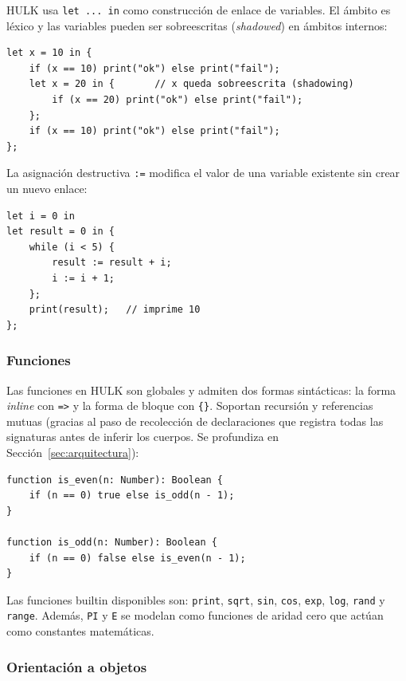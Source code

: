 \documentclass[12pt, a4paper]{article}
\begin{document}
HULK usa \texttt{let ... in} como construcción de enlace de variables. El
ámbito es léxico y las variables pueden ser sobreescritas (\textit{shadowed}) en ámbitos internos:

\begin{lstlisting}[caption={Variables y shadowing en HULK}, label=lst:let]
let x = 10 in {
    if (x == 10) print("ok") else print("fail");
    let x = 20 in {       // x queda sobreescrita (shadowing)
        if (x == 20) print("ok") else print("fail");
    };
    if (x == 10) print("ok") else print("fail");
};
\end{lstlisting}

La asignación destructiva \texttt{:=} modifica el valor de una variable
existente sin crear un nuevo enlace:

\begin{lstlisting}[caption={Asignación destructiva}, label=lst:assign]
let i = 0 in
let result = 0 in {
    while (i < 5) {
        result := result + i;
        i := i + 1;
    };
    print(result);   // imprime 10
};
\end{lstlisting}

\subsubsection{Funciones}

Las funciones en HULK son globales y admiten dos formas sintácticas: la forma
\textit{inline} con \texttt{=>} y la forma de bloque con \texttt{\{\}}. Soportan
recursión y referencias mutuas (gracias al paso de recolección de declaraciones
que registra todas las signaturas antes de inferir los cuerpos. Se profundiza en Sección~\ref{sec:arquitectura}):

\begin{lstlisting}[caption={Recursión mutua en HULK}, label=lst:mutual]
function is_even(n: Number): Boolean {
    if (n == 0) true else is_odd(n - 1);
}

function is_odd(n: Number): Boolean {
    if (n == 0) false else is_even(n - 1);
}
\end{lstlisting}

Las funciones builtin disponibles son: \texttt{print}, \texttt{sqrt},
\texttt{sin}, \texttt{cos}, \texttt{exp}, \texttt{log}, \texttt{rand} y
\texttt{range}. Además, \texttt{PI} y \texttt{E} se modelan como funciones
de aridad cero que actúan como constantes matemáticas.

\subsubsection{Orientación a objetos}
\end{document}
